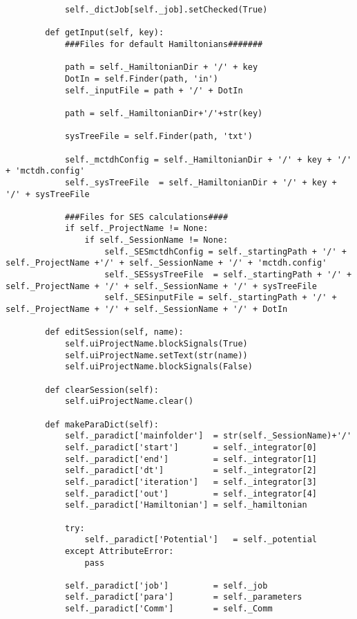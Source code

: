 \begin{verbatim}
            self._dictJob[self._job].setChecked(True)
    
        def getInput(self, key):
            ###Files for default Hamiltonians#######
            
            path = self._HamiltonianDir + '/' + key 
            DotIn = self.Finder(path, 'in')
            self._inputFile = path + '/' + DotIn
            
            path = self._HamiltonianDir+'/'+str(key)
    
            sysTreeFile = self.Finder(path, 'txt')
        
            self._mctdhConfig = self._HamiltonianDir + '/' + key + '/' + 'mctdh.config'
            self._sysTreeFile  = self._HamiltonianDir + '/' + key + '/' + sysTreeFile
    
            ###Files for SES calculations####
            if self._ProjectName != None:
                if self._SessionName != None:
                    self._SESmctdhConfig = self._startingPath + '/' + self._ProjectName +'/' + self._SessionName + '/' + 'mctdh.config'
                    self._SESsysTreeFile  = self._startingPath + '/' + self._ProjectName + '/' + self._SessionName + '/' + sysTreeFile
                    self._SESinputFile = self._startingPath + '/' + self._ProjectName + '/' + self._SessionName + '/' + DotIn
    
        def editSession(self, name):
            self.uiProjectName.blockSignals(True)
            self.uiProjectName.setText(str(name))
            self.uiProjectName.blockSignals(False)
    
        def clearSession(self):
            self.uiProjectName.clear()
    
        def makeParaDict(self):
            self._paradict['mainfolder']  = str(self._SessionName)+'/'
            self._paradict['start']       = self._integrator[0]
            self._paradict['end']         = self._integrator[1]
            self._paradict['dt']          = self._integrator[2]
            self._paradict['iteration']   = self._integrator[3]
            self._paradict['out']         = self._integrator[4]
            self._paradict['Hamiltonian'] = self._hamiltonian
    
            try:
                self._paradict['Potential']   = self._potential
            except AttributeError:
                pass
    
            self._paradict['job']         = self._job
            self._paradict['para']        = self._parameters
            self._paradict['Comm']        = self._Comm
    

\end{verbatim}
